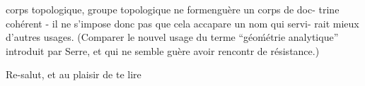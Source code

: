 
corps topologique, groupe topologique\deleted{,}  ne formen\hand{/}guère un corps de doc-%
trine cohérent - il ne s'impose donc pas que cela accapare un nom qui servi-%
rait mieux d'autres usages. (Comparer le nouvel usage du terme ``géo\'{m}étrie
analytique'' introduit par Serre, et qui ne semble guère avoir rencontr de
résistance.)

Re-salut, et au plaisir de te lire


